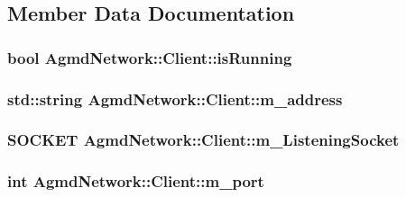 \subsection{Member Data Documentation}
\hypertarget{class_agmd_network_1_1_client_af4624c8cadd334df5d7da75e0615ca48}{
\subsubsection[{is\+Running}]{\setlength{\rightskip}{0pt plus 5cm}bool Agmd\+Network\+::\+Client\+::is\+Running\hspace{0.3cm}{\ttfamily [protected]}}}\label{class_agmd_network_1_1_client_af4624c8cadd334df5d7da75e0615ca48}
\hypertarget{class_agmd_network_1_1_client_a8488fd2d5310cdb60d2803aeb00ac700}{
\subsubsection[{m\+\_\+address}]{\setlength{\rightskip}{0pt plus 5cm}std\+::string Agmd\+Network\+::\+Client\+::m\+\_\+address\hspace{0.3cm}{\ttfamily [protected]}}}\label{class_agmd_network_1_1_client_a8488fd2d5310cdb60d2803aeb00ac700}
\hypertarget{class_agmd_network_1_1_client_a407549403b21e2ecd628f9ac57eebcc0}{
\subsubsection[{m\+\_\+\+Listening\+Socket}]{\setlength{\rightskip}{0pt plus 5cm}S\+O\+C\+K\+E\+T Agmd\+Network\+::\+Client\+::m\+\_\+\+Listening\+Socket\hspace{0.3cm}{\ttfamily [protected]}}}\label{class_agmd_network_1_1_client_a407549403b21e2ecd628f9ac57eebcc0}
\hypertarget{class_agmd_network_1_1_client_a6c607b962a694c76f8b8ce1713d0c193}{
\subsubsection[{m\+\_\+port}]{\setlength{\rightskip}{0pt plus 5cm}int Agmd\+Network\+::\+Client\+::m\+\_\+port\hspace{0.3cm}{\ttfamily [protected]}}}\label{class_agmd_network_1_1_client_a6c607b962a694c76f8b8ce1713d0c193}
